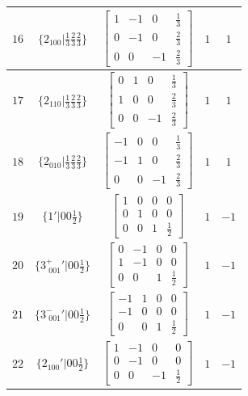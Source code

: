 \documentclass[fleqn,8pt]{jsarticle}
\begin{document}
\begin{longtable}{ccccc}
$ 16 $ & $ \{2{}_{100}|\frac{1}{3} \frac{2}{3} \frac{2}{3}\} $ & $ \begin{bmatrix} 1 & -1 & 0 & \frac{1}{3} \\ 0 & -1 & 0 & \frac{2}{3} \\ 0 & 0 & -1 & \frac{2}{3} \end{bmatrix} $ & $ 1 $ & $ 1 $ \\ \hline
$ 17 $ & $ \{2{}_{110}|\frac{1}{3} \frac{2}{3} \frac{2}{3}\} $ & $ \begin{bmatrix} 0 & 1 & 0 & \frac{1}{3} \\ 1 & 0 & 0 & \frac{2}{3} \\ 0 & 0 & -1 & \frac{2}{3} \end{bmatrix} $ & $ 1 $ & $ 1 $ \\ \hline
$ 18 $ & $ \{2{}_{010}|\frac{1}{3} \frac{2}{3} \frac{2}{3}\} $ & $ \begin{bmatrix} -1 & 0 & 0 & \frac{1}{3} \\ -1 & 1 & 0 & \frac{2}{3} \\ 0 & 0 & -1 & \frac{2}{3} \end{bmatrix} $ & $ 1 $ & $ 1 $ \\ \hline
$ 19 $ & $ \{1{}'|0 0 \frac{1}{2}\} $ & $ \begin{bmatrix} 1 & 0 & 0 & 0 \\ 0 & 1 & 0 & 0 \\ 0 & 0 & 1 & \frac{1}{2} \end{bmatrix} $ & $ 1 $ & $ -1 $ \\ \hline
$ 20 $ & $ \{3^{+}_{\,\,001}{}'|0 0 \frac{1}{2}\} $ & $ \begin{bmatrix} 0 & -1 & 0 & 0 \\ 1 & -1 & 0 & 0 \\ 0 & 0 & 1 & \frac{1}{2} \end{bmatrix} $ & $ 1 $ & $ -1 $ \\ \hline
$ 21 $ & $ \{3^{-}_{\,\,001}{}'|0 0 \frac{1}{2}\} $ & $ \begin{bmatrix} -1 & 1 & 0 & 0 \\ -1 & 0 & 0 & 0 \\ 0 & 0 & 1 & \frac{1}{2} \end{bmatrix} $ & $ 1 $ & $ -1 $ \\ \hline
$ 22 $ & $ \{2{}_{100}{}'|0 0 \frac{1}{2}\} $ & $ \begin{bmatrix} 1 & -1 & 0 & 0 \\ 0 & -1 & 0 & 0 \\ 0 & 0 & -1 & \frac{1}{2} \end{bmatrix} $ & $ 1 $ & $ -1 $ \\ \hline

\end{longtable}
\end{document}
